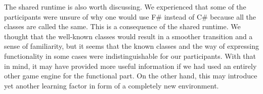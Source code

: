 The shared runtime is also worth discussing. We experienced that some of the participants were unsure of why one would use F\# instead of C\# because all the classes are called the same. This is a consequence of the shared runtime. We thought that the well-known classes would result in a smoother transition and a sense of familiarity, but it seems that the known classes and the way of expressing functionality in some cases were indistinguishable for our participants. With that in mind, it may have provided more useful information if we had used an entirely other game engine for the functional part. On the other hand, this may introduce yet another learning factor in form of a completely new environment.
